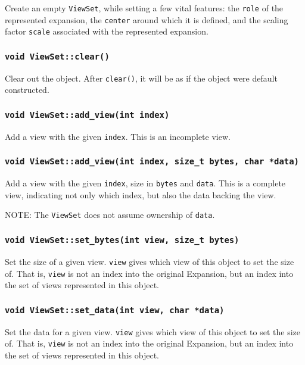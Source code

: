 Create an empty \texttt{ViewSet}, while setting a few vital features: the
\texttt{role} of the represented expansion, the \texttt{center} around which it
is defined, and the scaling factor \texttt{scale} associated with the
represented expansion.

\subsubsection{\texttt{void ViewSet::clear()}}

Clear out the object. After \texttt{clear()}, it will be as if the object
were default constructed.

\subsubsection{\texttt{void ViewSet::add\_view(int index)}}

Add a view with the given \texttt{index}. This is an incomplete view.

\subsubsection{\texttt{void ViewSet::add\_view(int index, size\_t bytes, char *data)}}

Add a view with the given \texttt{index}, size in \texttt{bytes} and
\texttt{data}. This is a complete view, indicating not only which index, but
also the data backing the view.

NOTE: The \texttt{ViewSet} does not assume ownership of \texttt{data}.

\subsubsection{\texttt{void ViewSet::set\_bytes(int view, size\_t bytes)}}

Set the size of a given view. \texttt{view} gives which view of this object to
set the size of. That is, \texttt{view} is not an index into the original
Expansion, but an index into the set of views represented in this object.

\subsubsection{\texttt{void ViewSet::set\_data(int view, char *data)}}

Set the data for a given view. \texttt{view} gives which view of this object to
set the size of. That is, \texttt{view} is not an index into the original
Expansion, but an index into the set of views represented in this object.


